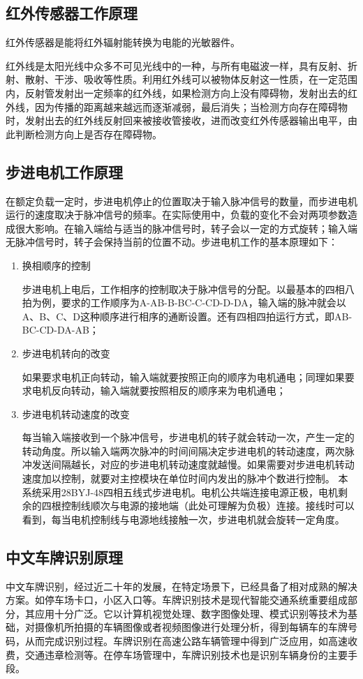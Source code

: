 \subsection{红外传感器工作原理}
红外传感器是能将红外辐射能转换为电能的光敏器件。

红外线是太阳光线中众多不可见光线中的一种，与所有电磁波一样，具有反射、折射、散射、干涉、吸收等性质。利用红外线可以被物体反射这一性质，在一定范围内，反射管发射出一定频率的红外线，如果检测方向上没有障碍物，发射出去的红外线，因为传播的距离越来越远而逐渐减弱，最后消失；当检测方向存在障碍物时，发射出去的红外线反射回来被接收管接收，进而改变红外传感器输出电平，由此判断检测方向上是否存在障碍物。

\subsection{步进电机工作原理}
在额定负载一定时，步进电机停止的位置取决于输入脉冲信号的数量，而步进电机运行的速度取决于脉冲信号的频率。在实际使用中，负载的变化不会对两项参数造成很大影响。在输入端给与适当的脉冲信号时，转子会以一定的方式旋转；输入端无脉冲信号时，转子会保持当前的位置不动。步进电机工作的基本原理如下：
\begin{enumerate}
	\item 换相顺序的控制

		  步进电机上电后，工作相序的控制取决于脉冲信号的分配。以最基本的四相八拍为例，要求的工作顺序为A-AB-B-BC-C-CD-D-DA，输入端的脉冲就会以A、B、C、D这种顺序进行相序的通断设置。还有四相四拍运行方式，即AB-BC-CD-DA-AB；
		  
	\item 步进电机转向的改变

	      如果要求电机正向转动，输入端就要按照正向的顺序为电机通电；同理如果要求电机反向转动，输入端就要按照相反的顺序来为电机通电；

	\item 步进电机转动速度的改变

	      每当输入端接收到一个脉冲信号，步进电机的转子就会转动一次，产生一定的转动角度。所以输入端两次脉冲的时间间隔决定步进电机的转动速度，两次脉冲发送间隔越长，对应的步进电机转动速度就越慢。如果需要对步进电机转动速度加以控制，就要对主控模块在单位时间内发出的脉冲个数进行控制。
	      本系统采用28BYJ-48四相五线式步进电机。电机公共端连接电源正极，电机剩余的四根控制线顺次与电源的接地端（此处可理解为负极）连接。接线时可以看到，每当电机控制线与电源地线接触一次，步进电机就会旋转一定角度。
\end{enumerate}

\subsection{中文车牌识别原理}
中文车牌识别，经过近二十年的发展，在特定场景下，已经具备了相对成熟的解决方案。如停车场卡口，小区入口等。车牌识别技术是现代智能交通系统重要组成部分，其应用十分广泛。它以计算机视觉处理、数字图像处理、模式识别等技术为基础，对摄像机所拍摄的车辆图像或者视频图像进行处理分析，得到每辆车的车牌号码，从而完成识别过程。车牌识别在高速公路车辆管理中得到广泛应用，如高速收费，交通违章检测等。在停车场管理中，车牌识别技术也是识别车辆身份的主要手段。

